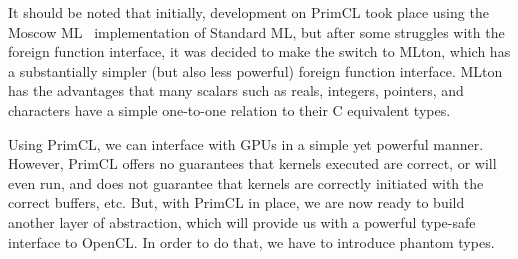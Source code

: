 It should be noted that initially, development on PrimCL took place
using the Moscow ML~\cite{mosml} implementation of Standard ML, but
after some struggles with the foreign function interface, it was
decided to make the switch to MLton, which has a substantially simpler
(but also less powerful) foreign function interface. MLton has the
advantages that many scalars such as reals, integers, pointers, and
characters have a simple one-to-one relation to their C equivalent
types.

Using PrimCL, we can interface with GPUs in a simple yet powerful
manner. However, PrimCL offers no guarantees that kernels executed are
correct, or will even run, and does not guarantee that kernels are
correctly initiated with the correct buffers, etc. But, with PrimCL in
place, we are now ready to build another layer of abstraction, which
will provide us with a powerful type-safe interface to OpenCL. In
order to do that, we have to introduce phantom types.
